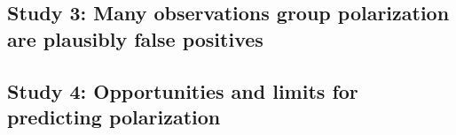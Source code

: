 \documentclass[12pt,letterpaper]{article}
\begin{document}
\subsection{Study 3: Many observations group polarization are plausibly false positives}

\subsection{Study 4: Opportunities and limits for predicting polarization}





\setlength{\bibleftmargin}{.125in}
\setlength{\bibindent}{-\bibleftmargin}


\end{document}
